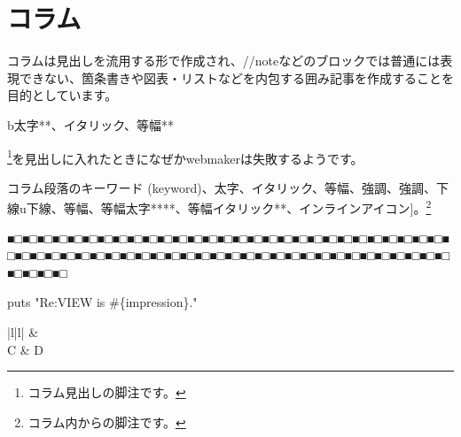 \chapter{コラム}
\label{chap:ch03}

コラムは見出しを流用する形で作成され、//noteなどのブロックでは普通には表現できない、箇条書きや図表・リストなどを内包する囲み記事を作成することを目的としています。

b太字**、イタリック、等幅**

\footnote{コラム見出しの脚注です。}を見出しに入れたときになぜかwebmakerは失敗するようです。

コラム段落のキーワード (keyword)、太字、イタリック、等幅、強調、強調、下線u下線、等幅、等幅太字****、等幅イタリック**、インラインアイコン]。\footnote{コラム内からの脚注です。}

■□■□■□■□■□■□■□■□■□■□■□■□■□■□■□■□■□■□■□■□■□■□■□■□■□■□■□■□■□■□■□■□■□■□■□■□■□■□■□■□■□■□■□■□■□■□■□■□■□■□■□■□■□■□■□■□■□■□■□■□■□■□■□


\begin{reviewlistblock}
\begin{reviewemlist}
puts "Re:VIEW is \#\{impression\}."
\end{reviewemlist}
\end{reviewlistblock}

\begin{reviewimage}%
\label{image:ch03:img3-1}
\end{reviewimage}
\begin{reviewimage}%
\label{image:ch03:img3-2}
\end{reviewimage}

\begin{reviewtable}{|l|l|}
\hline
{} &  \\  \hline
C & D \\  \hline
\end{reviewtable}


